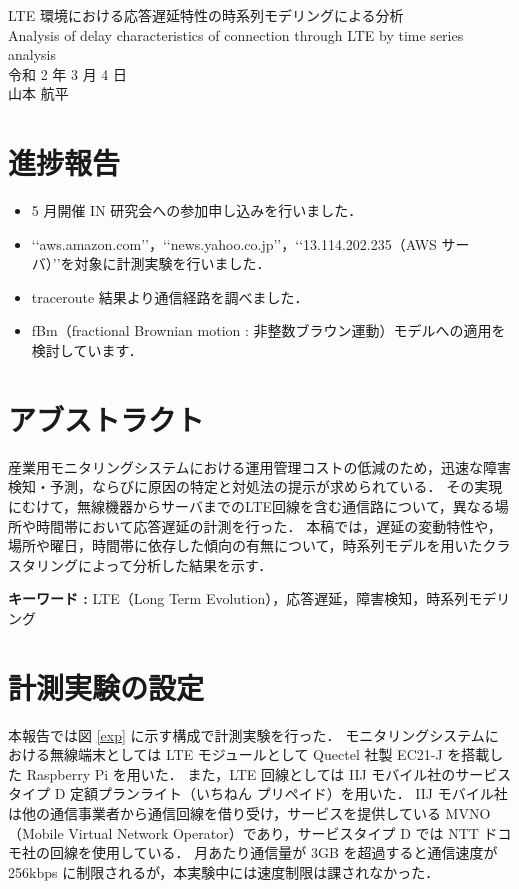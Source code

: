 \documentclass[a4j]{jarticle}
\begin{document}
\begin{table}[t]
\begin{center}
{\large LTE 環境における応答遅延特性の時系列モデリングによる分析}\\
Analysis of delay characteristics of connection through LTE by time series analysis\\
令和 2 年 3 月 4 日\\
山本 航平
\end{center}
\end{table}

\section{進捗報告}
\begin{itemize}
\item 5 月開催 IN 研究会への参加申し込みを行いました．
\item \lq{}\lq{}aws.amazon.com\rq{}\rq{}，\lq{}\lq{}news.yahoo.co.jp\rq{}\rq{}，\lq{}\lq{}13.114.202.235（AWS サーバ）\rq{}\rq{}を対象に計測実験を行いました．
\item traceroute 結果より通信経路を調べました．
\item fBm（fractional Brownian motion : 非整数ブラウン運動）モデルへの適用を検討しています．
\end{itemize}

\section{アブストラクト}
産業用モニタリングシステムにおける運用管理コストの低減のため，迅速な障害検知・予測，ならびに原因の特定と対処法の提示が求められている．
その実現にむけて，無線機器からサーバまでのLTE回線を含む通信路について，異なる場所や時間帯において応答遅延の計測を行った．
本稿では，遅延の変動特性や，場所や曜日，時間帯に依存した傾向の有無について，時系列モデルを用いたクラスタリングによって分析した結果を示す．

\textbf{キーワード : }LTE（Long Term Evolution），応答遅延，障害検知，時系列モデリング\\
\section{計測実験の設定}
本報告では図 \ref{exp} に示す構成で計測実験を行った．
モニタリングシステムにおける無線端末としては LTE モジュールとして Quectel 社製 EC21-J を搭載した Raspberry Pi を用いた．
また，LTE 回線としては IIJ モバイル社のサービスタイプ D 定額プランライト（いちねん プリペイド）を用いた．
IIJ モバイル社は他の通信事業者から通信回線を借り受け，サービスを提供している MVNO（Mobile Virtual Network Operator）であり，サービスタイプ D では NTT ドコモ社の回線を使用している．
月あたり通信量が 3GB を超過すると通信速度が 256kbps に制限されるが，本実験中には速度制限は課されなかった．
\end{document}
